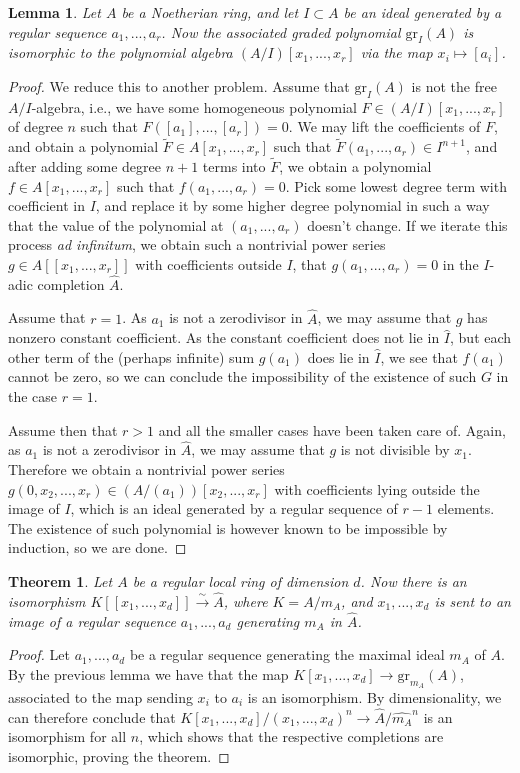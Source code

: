 \documentclass[12pt,a4paper,leqno]{article}
\newcommand{\isomto}{\stackrel{\sim}{\rightarrow}}
\newcommand{\gr}{\mathrm{gr}}
\theoremstyle{plain}
\newtheorem{thm}[theo]{Theorem}
\newtheorem{lem}[theo]{Lemma}
\theoremstyle{definition}
\theoremstyle{remark}
\begin{document}
\begin{lem}\label{AssociatedPolynomials}
Let $A$ be a Noetherian ring, and let $I \subset A$ be an ideal generated by a regular sequence $a_1, ... , a_r$. Now the associated graded polynomial $\gr_I (A)$ is isomorphic to the polynomial algebra $(A/I) [x_1,...,x_r]$ via the map $x_i \mapsto [a_i]$.
\end{lem}
\begin{proof}
We reduce this to another problem. Assume that $\gr_I (A)$ is not the free $A/I$-algebra, i.e., we have some homogeneous polynomial $F \in (A/I)[x_1,...,x_r]$ of degree $n$ such that $F([a_1], ... , [a_r]) = 0$. We may lift the coefficients of $F$, and obtain a polynomial $\widetilde F \in A[x_1,...,x_r]$ such that $\widetilde F (a_1,...,a_r) \in I^{n+1}$, and after adding some degree $n+1$ terms into $\widetilde F$, we obtain a polynomial $f \in A[x_1,...,x_r]$ such that $f(a_1,...,a_r) = 0$. Pick some lowest degree term with coefficient in $I$, and replace it by some higher degree polynomial in such a way that the value of the polynomial at $(a_1,...,a_r)$ doesn't change. If we iterate this process \emph{ad infinitum}, we obtain such a nontrivial power series $g \in A[[x_1,...,x_r]]$ with coefficients outside $I$, that $g (a_1,...,a_r) = 0$ in the $I$-adic completion $\widehat{A}$.

Assume that $r = 1$. As $a_1$ is not a zerodivisor in $\widehat A$, we may assume that $g$ has nonzero constant coefficient. As the constant coefficient does not lie in $\widehat I$, but each other term of the (perhaps infinite) sum  $g(a_1)$ does lie in $\widehat I$, we see that $f(a_1)$ cannot be zero, so we can conclude the impossibility of the existence of such $G$ in the case $r=1$.

Assume then that $r>1$ and all the smaller cases have been taken care of. Again, as $a_1$ is not a zerodivisor in $\widehat A$, we may assume that $g$ is not divisible by $x_1$. Therefore we obtain a nontrivial power series $g(0,x_2,...,x_r) \in (A/(a_1))[x_2,...,x_r]$ with coefficients lying outside the image of $I$, which is an ideal generated by a regular sequence of $r-1$ elements. The existence of such polynomial is however known to be impossible by induction, so we are done.
\end{proof}

\begin{thm}
Let $A$ be a regular local ring of dimension $d$. Now there is an isomorphism $K[[x_1,...,x_d]] \isomto \widehat A$, where $K = A/m_A$, and $x_1,...,x_d$ is sent to an image of a regular sequence $a_1,...,a_d$ generating $m_A$ in $\widehat A$.
\end{thm}
\begin{proof}
Let $a_1,...,a_d$ be a regular sequence generating the maximal ideal $m_A$ of $A$. By the previous lemma we have that the map $K[x_1,...,x_d] \to \gr_{m_A} (A)$, associated to the map sending $x_i$ to $a_i$ is an isomorphism. By dimensionality, we can therefore conclude that $K[x_1,...,x_d] / (x_1,...,x_d)^n \to \widehat A / \widehat{m_A}^n$ is an isomorphism for all $n$, which shows that the respective completions are isomorphic, proving the theorem.
\end{proof}
\end{document}
